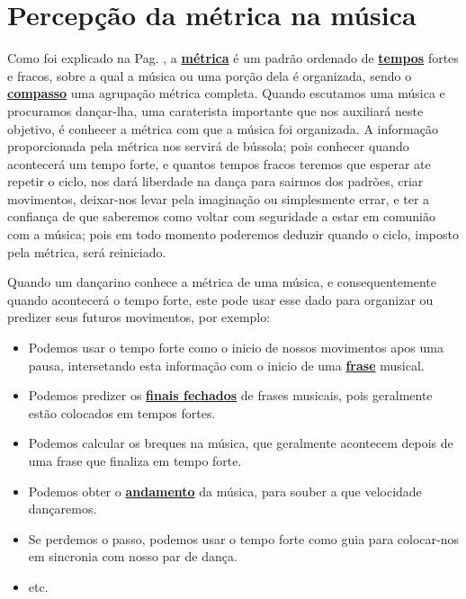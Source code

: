 
\section{Percepção da métrica na música}
\label{sec:percepcionmetrica}
Como foi explicado na Pag. \pageref{def:Metrica}, 
a \hyperref[def:Metrica]{\textbf{métrica}} é um padrão ordenado de \hyperref[sec:Tempo]{\textbf{tempos}} fortes e fracos,
sobre a qual a música ou uma porção dela é organizada, 
sendo o \hyperref[def:Compasso]{\textbf{compasso}} uma agrupação métrica completa.
Quando escutamos uma música e procuramos dançar-lha, 
uma caraterista importante que nos auxiliará neste objetivo,
é conhecer a métrica com que a música foi organizada.
A informação proporcionada pela métrica nos servirá de bússola;
pois conhecer quando acontecerá um tempo forte, 
e quantos tempos fracos teremos que esperar ate repetir o ciclo,
nos dará liberdade na dança para sairmos dos padrões, criar movimentos, deixar-nos levar pela imaginação ou simplesmente errar,
 e ter a confiança de que saberemos como voltar com seguridade a estar em comunião com a música;
pois em todo momento poderemos deduzir quando o ciclo, imposto pela métrica, será reiniciado.

Quando um dançarino conhece a métrica de uma música,
e consequentemente quando acontecerá o tempo forte,
este pode usar esse dado para  organizar ou predizer seus futuros movimentos, 
por exemplo:
\begin{itemize}
\item Podemos usar o tempo forte como o inicio de nossos movimentos apos uma pausa,  
intersetando esta informação com o inicio de uma \hyperref[sec:Frase]{\textbf{frase}} musical.
\item Podemos predizer os \hyperref[subsec:FinalAbertoFechado]{\textbf{finais fechados}} 
de frases musicais,
 pois geralmente estão colocados em tempos fortes.
\item Podemos calcular os breques na música, que geralmente  acontecem depois de uma frase que finaliza em tempo forte.
\item Podemos obter o \hyperref[sec:Andamento]{\textbf{andamento}} da música,
para souber a que velocidade dançaremos. 
\item Se perdemos o passo, podemos usar o tempo forte como guia para colocar-nos em sincronia com nosso par de dança.
\item etc.
\end{itemize}


